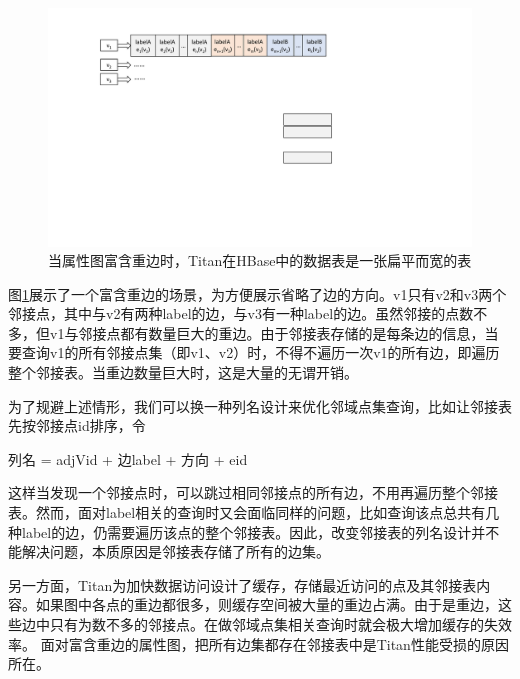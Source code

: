 \begin{figure}[htbp]
\centering
\includegraphics[width=150mm]{fig/original_list.pdf}
\caption{当属性图富含重边时，Titan在HBase中的数据表是一张扁平而宽的表}
\label{fig:orginal_list}
\end{figure}

图\ref{fig:orginal_list}展示了一个富含重边的场景，为方便展示省略了边的方向。v1只有v2和v3两个邻接点，其中与v2有两种label的边，与v3有一种label的边。虽然邻接的点数不多，但v1与邻接点都有数量巨大的重边。由于邻接表存储的是每条边的信息，当要查询v1的所有邻接点集（即v1、v2）时，不得不遍历一次v1的所有边，即遍历整个邻接表。当重边数量巨大时，这是大量的无谓开销。

为了规避上述情形，我们可以换一种列名设计来优化邻域点集查询，比如让邻接表先按邻接点id排序，令
\begin{center}
  列名 = adjVid + 边label + 方向 + eid
\end{center}
这样当发现一个邻接点时，可以跳过相同邻接点的所有边，不用再遍历整个邻接表。然而，面对label相关的查询时又会面临同样的问题，比如查询该点总共有几种label的边，仍需要遍历该点的整个邻接表。因此，改变邻接表的列名设计并不能解决问题，本质原因是邻接表存储了所有的边集。

另一方面，Titan为加快数据访问设计了缓存，存储最近访问的点及其邻接表内容。如果图中各点的重边都很多，则缓存空间被大量的重边占满。由于是重边，这些边中只有为数不多的邻接点。在做邻域点集相关查询时就会极大增加缓存的失效率。
面对富含重边的属性图，把所有边集都存在邻接表中是Titan性能受损的原因所在。

